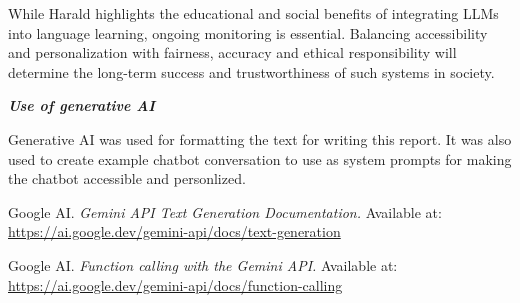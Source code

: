 \documentclass[a4paper,10pt]{article}
\begin{document}
While Harald highlights the educational and social benefits of integrating LLMs into language learning, ongoing monitoring is essential. Balancing accessibility and personalization with fairness, accuracy and ethical responsibility will determine the long-term success and trustworthiness of such systems in society.
	
\hfill \break
\textit{\textbf{Use of generative AI}}

Generative AI was used for formatting the text for writing this report. It was also used to create example chatbot conversation to use as system prompts for making the chatbot accessible and personlized.


\hfill \break


\begin{thebibliography}{1}

Google AI. \textit{Gemini API Text Generation Documentation.} 
Available at: \url{https://ai.google.dev/gemini-api/docs/text-generation}

Google AI. \textit{Function calling with the Gemini API.} Available at: \url{https://ai.google.dev/gemini-api/docs/function-calling}

\end{thebibliography}


	
	
%	
%	
%	
\end{document}
